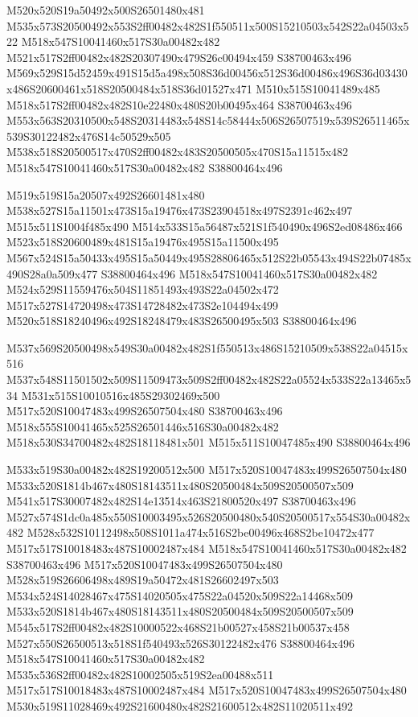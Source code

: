 \documentclass{article}
\begin{document}
\begin{multicols}{2}
M520x520S19a50492x500S26501480x481 M535x573S20500492x553S2ff00482x482S1f550511x500S15210503x542S22a04503x522 M518x547S10041460x517S30a00482x482 M521x517S2ff00482x482S20307490x479S26c00494x459 S38700463x496 M569x529S15d52459x491S15d5a498x508S36d00456x512S36d00486x496S36d03430x486S20600461x518S20500484x518S36d01527x471 M510x515S10041489x485 M518x517S2ff00482x482S10e22480x480S20b00495x464 S38700463x496 M553x563S20310500x548S20314483x548S14c58444x506S26507519x539S26511465x539S30122482x476S14c50529x505 M538x518S20500517x470S2ff00482x483S20500505x470S15a11515x482 M518x547S10041460x517S30a00482x482 S38800464x496

M519x519S15a20507x492S26601481x480 M538x527S15a11501x473S15a19476x473S23904518x497S2391c462x497 M515x511S1004f485x490 M514x533S15a56487x521S1f540490x496S2ed08486x466 M523x518S20600489x481S15a19476x495S15a11500x495 M567x524S15a50433x495S15a50449x495S28806465x512S22b05543x494S22b07485x490S28a0a509x477 S38800464x496 M518x547S10041460x517S30a00482x482 M524x529S11559476x504S11851493x493S22a04502x472 M517x527S14720498x473S14728482x473S2e104494x499 M520x518S18240496x492S18248479x483S26500495x503 S38800464x496

M537x569S20500498x549S30a00482x482S1f550513x486S15210509x538S22a04515x516 M537x548S11501502x509S11509473x509S2ff00482x482S22a05524x533S22a13465x534 M531x515S10010516x485S29302469x500 M517x520S10047483x499S26507504x480 S38700463x496 M518x555S10041465x525S26501446x516S30a00482x482 M518x530S34700482x482S18118481x501 M515x511S10047485x490 S38800464x496

M533x519S30a00482x482S19200512x500 M517x520S10047483x499S26507504x480 M533x520S1814b467x480S18143511x480S20500484x509S20500507x509 M541x517S30007482x482S14e13514x463S21800520x497 S38700463x496 M527x574S1dc0a485x550S10003495x526S20500480x540S20500517x554S30a00482x482 M528x532S10112498x508S1011a474x516S2be00496x468S2be10472x477 M517x517S10018483x487S10002487x484 M518x547S10041460x517S30a00482x482 S38700463x496 M517x520S10047483x499S26507504x480 M528x519S26606498x489S19a50472x481S26602497x503 M534x524S14028467x475S14020505x475S22a04520x509S22a14468x509 M533x520S1814b467x480S18143511x480S20500484x509S20500507x509 M545x517S2ff00482x482S10000522x468S21b00527x458S21b00537x458 M527x550S26500513x518S1f540493x526S30122482x476 S38800464x496 M518x547S10041460x517S30a00482x482 M535x536S2ff00482x482S10002505x519S2ea00488x511 M517x517S10018483x487S10002487x484 M517x520S10047483x499S26507504x480 M530x519S11028469x492S21600480x482S21600512x482S11020511x492


\end{multicols}
\end{document}
